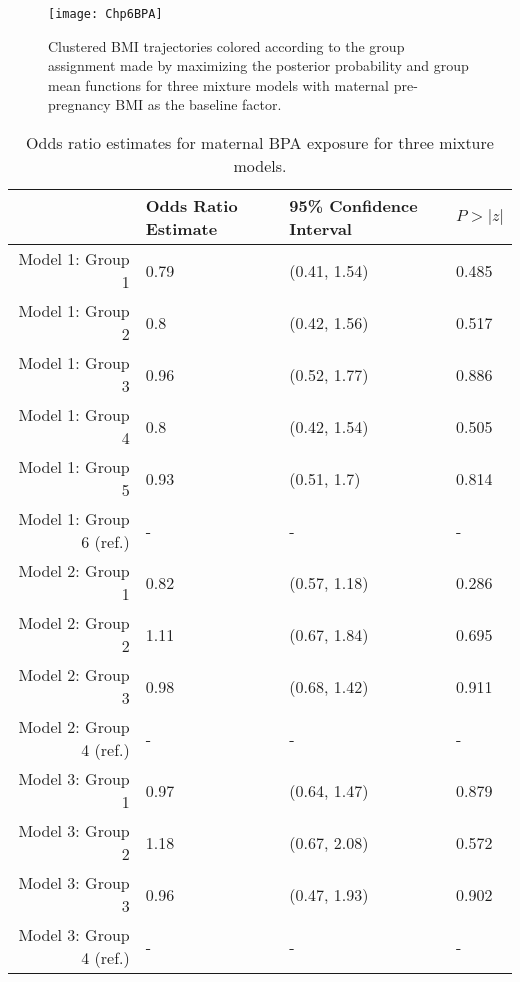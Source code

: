 \begin{figure}[h]
\begin{center}
\texttt{[image: Chp6BPA]}
\end{center}
\label{fig:6-2}
\caption{Clustered BMI trajectories colored according to the group assignment made by maximizing the posterior probability and group mean functions for three mixture models with maternal pre-pregnancy BMI as the baseline factor.}
\end{figure}

\begin{table}[ht]
\begin{center}
\begin{tabular}{rlll}
  \hline
 & Odds Ratio Estimate & 95\% Confidence Interval & $P>|z|$ \\ 
  \hline
Model 1: Group  1 & 0.79 & (0.41, 1.54) & 0.485 \\ 
  Model 1: Group  2 & 0.8 & (0.42, 1.56) & 0.517 \\ 
  Model 1: Group  3 & 0.96 & (0.52, 1.77) & 0.886 \\ 
  Model 1: Group  4 & 0.8 & (0.42, 1.54) & 0.505 \\ 
  Model 1: Group  5 & 0.93 & (0.51, 1.7) & 0.814 \\ 
  Model 1: Group  6  (ref.) & - & - & - \\ 
  Model 2: Group  1 & 0.82 & (0.57, 1.18) & 0.286 \\ 
  Model 2: Group  2 & 1.11 & (0.67, 1.84) & 0.695 \\ 
  Model 2: Group  3 & 0.98 & (0.68, 1.42) & 0.911 \\ 
  Model 2: Group  4  (ref.) & - & - & - \\ 
  Model 3: Group  1 & 0.97 & (0.64, 1.47) & 0.879 \\ 
  Model 3: Group  2 & 1.18 & (0.67, 2.08) & 0.572 \\ 
  Model 3: Group  3 & 0.96 & (0.47, 1.93) & 0.902 \\ 
  Model 3: Group  4  (ref.) & - & - & - \\ 
   \hline
\end{tabular}
\caption{Odds ratio estimates for maternal BPA exposure for three mixture models. }
\end{center}
\label{tab:6-2}
\end{table}

